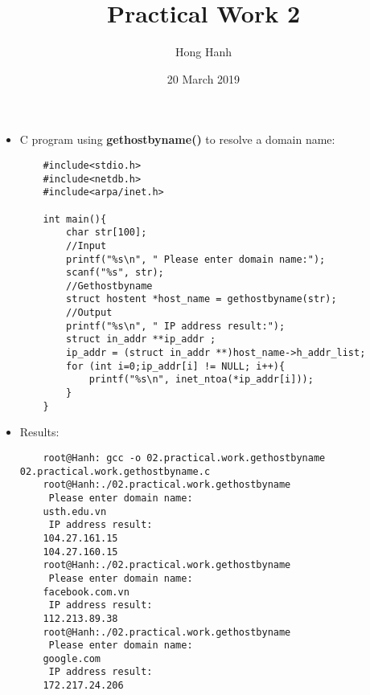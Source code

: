 \documentclass{article}
\title{Practical Work 2}
\author {Hong Hanh}
\date{20 March 2019}
\begin{document}
\maketitle

\begin{itemize}
    \item C program using \textbf{gethostbyname()} to resolve a domain name:
    \begin{verbatim}
	#include<stdio.h>
	#include<netdb.h>
	#include<arpa/inet.h>
	
	int main(){	
		char str[100];
		//Input
		printf("%s\n", " Please enter domain name:");
		scanf("%s", str);
		//Gethostbyname
		struct hostent *host_name = gethostbyname(str);
		//Output
		printf("%s\n", " IP address result:");
		struct in_addr **ip_addr ;
		ip_addr = (struct in_addr **)host_name->h_addr_list;
		for (int i=0;ip_addr[i] != NULL; i++){
			printf("%s\n", inet_ntoa(*ip_addr[i]));
		}
	}
    \end{verbatim}
	\item Results:
    \begin{verbatim}
	root@Hanh: gcc -o 02.practical.work.gethostbyname 02.practical.work.gethostbyname.c
	root@Hanh:./02.practical.work.gethostbyname
	 Please enter domain name:
	usth.edu.vn
	 IP address result:
	104.27.161.15
	104.27.160.15
	root@Hanh:./02.practical.work.gethostbyname
	 Please enter domain name:
	facebook.com.vn
	 IP address result:
	112.213.89.38
	root@Hanh:./02.practical.work.gethostbyname
	 Please enter domain name:
	google.com
	 IP address result:
	172.217.24.206
    \end{verbatim}
\end{itemize}
\end{document}
